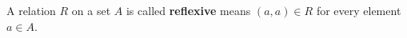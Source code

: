 
A relation $R$ on a set $A$ is called {\bf reflexive} means $(a, a) \in R$ for every element $a \in A$. 